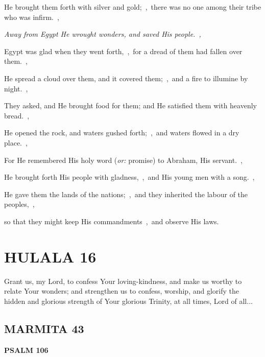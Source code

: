 \documentclass[12pt,twoside,a5paper]{article}
\newcommand{\hulala}[1]{\section*{HULALA {#1}}}
\newcommand{\marmita}[1]{\subsection*{MARMITA {#1}}}
\newcommand{\psalm}[1]{\textbf{PSALM {#1}}\nopagebreak}
\newcommand{\slota}[1]{\liturgicalhint{Slota.} #1}
\newcommand{\translationoption}[1]{\emph{or:} #1}
\begin{document}
\begin{normalparskip}
  He brought them forth with silver and gold;~\sep\ there was no one among their tribe who was infirm.~\sep

  \emph{Away from Egypt He wrought wonders, and saved His people.~\sep}

  Egypt was glad when they went forth,~\sep\ for a dread of them had fallen over them.~\sep

  He spread a cloud over them, and it covered them;~\sep\ and a fire to illumine by night.~\sep

  They asked, and He brought food for them; and He satisfied them with heavenly bread.~\sep

  He opened the rock, and waters gushed forth;~\sep\ and waters flowed in a dry place.~\sep

  For He remembered His holy word (\translationoption{promise}) to Abraham, His servant.~\sep

  He brought forth His people with gladness,~\sep\ and His young men with a song.~\sep

  He gave them the lands of the nations;~\sep\ and they inherited the labour of the peoples,~\sep

  so that they might keep His commandments~\sep\ and observe His laws.
\end{normalparskip}


\hulala{16}

\slota{Grant us, my Lord, to confess Your loving-kindness, and make us worthy to relate Your wonders; and strengthen us to confess, worship, and glorify the hidden and glorious strength of Your glorious Trinity, at all times, Lord of all...}

\marmita{43}

\psalm{106}
\end{document}
